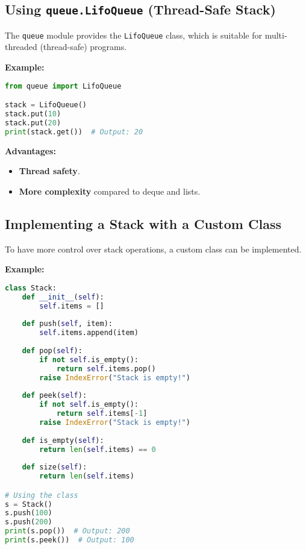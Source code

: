 \documentclass{article}
\begin{document}
\subsection{Using \texttt{queue.LifoQueue} (Thread-Safe Stack)}

The \texttt{queue} module provides the \texttt{LifoQueue} class, which is suitable for multi-threaded (thread-safe) programs.

\textbf{Example:}

\begin{lstlisting}[language=Python]
from queue import LifoQueue

stack = LifoQueue()
stack.put(10)
stack.put(20)
print(stack.get())  # Output: 20
\end{lstlisting}

\textbf{Advantages:}

\begin{itemize}
    \item \textbf{Thread safety}.
    \item \textbf{More complexity} compared to deque and lists.
\end{itemize}

\subsection{Implementing a Stack with a Custom Class}

To have more control over stack operations, a custom class can be implemented.

\textbf{Example:}

\begin{lstlisting}[language=Python]
class Stack:
    def __init__(self):
        self.items = []
    
    def push(self, item):
        self.items.append(item)
    
    def pop(self):
        if not self.is_empty():
            return self.items.pop()
        raise IndexError("Stack is empty!")
    
    def peek(self):
        if not self.is_empty():
            return self.items[-1]
        raise IndexError("Stack is empty!")
    
    def is_empty(self):
        return len(self.items) == 0
    
    def size(self):
        return len(self.items)

# Using the class
s = Stack()
s.push(100)
s.push(200)
print(s.pop())  # Output: 200
print(s.peek())  # Output: 100
\end{lstlisting}
\end{document}
